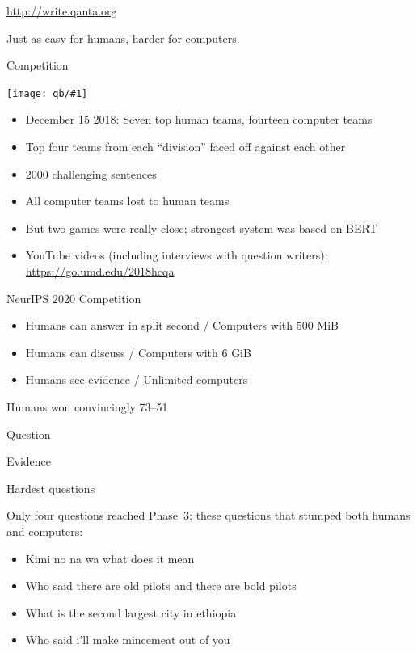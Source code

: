 \documentclass[xcolor=dvipsnames,xcolor=table]{beamer}
\newcommand{\fsi}[2]{
\begin{frame}[plain]
\vspace*{-1pt}
\makebox[\linewidth]{\texttt{[image: \#1]}}
\begin{center}
#2
\end{center}
\end{frame}
}
\newcommand{\gfxq}[2]{
\begin{center}
	\texttt{[image: qb/\#1]}
\end{center}
}
\begin{document}

\fsi{qb/trick/brahms_0}{\href{http://write.qanta.org}{http://write.qanta.org}}
\fsi{qb/trick/brahms_1}{}
\fsi{qb/trick/brahms_2}{}
\fsi{qb/trick/brahms_3}{}
\fsi{qb/trick/brahms_4}{}
\fsi{qb/trick/brahms_5}{}


\fsi{qb/trick/round_one}{Just as easy for humans, harder for computers.}



\begin{frame}{Competition}

  \gfxq{trick/pace}{.8}

\begin{itemize}
  \item December 15 2018: Seven top human teams, fourteen computer teams
  \item Top four teams from each ``division'' faced off against each
    other
    \item 2000 challenging sentences
    \pause
  \item All computer teams lost to human teams
    \pause
  \item But two games were really close; strongest system was based on BERT
  \item YouTube videos (including interviews with question writers): \href{https://go.umd.edu/2018hcqa}{https://go.umd.edu/2018hcqa}
\end{itemize}

\end{frame}

\begin{frame}{NeurIPS 2020 Competition}

  \begin{itemize}
  \item Humans can answer in split second / Computers with 500 MiB
  \item Humans can discuss / Computers with 6 GiB
    \item Humans see evidence / Unlimited computers
  \end{itemize}

  \pause
  Humans won convincingly 73--51
\end{frame}

\fsi{qb/hcqa_neurips_2020}{Question}
\fsi{qb/neurips_hcqa_evidence}{Evidence}

\begin{frame}{Hardest questions}

Only four questions reached Phase~3; these questions that stumped both humans and computers:
\begin{itemize}
    \item Kimi no na wa what does it mean
    \item Who said there are old pilots and there are bold pilots
    \item What is the second largest city in ethiopia
    \item Who said i'll make mincemeat out of you
\end{itemize}
  
\end{frame}
\end{document}

